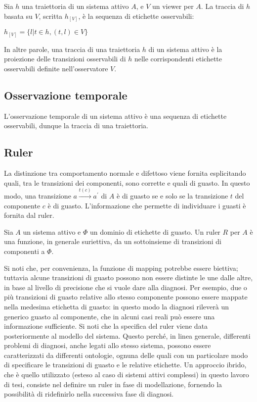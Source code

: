 \begin{defn}
Sia $h$ una traiettoria di un sistema attivo $A$, e $V$ un viewer per $A$. La traccia di $h$ basata su $V$, scritta $h_{[V]}$, è la sequenza di etichette osservabili:
\begin{center}
$h_{[V]} = \{l|t \in h, (t,l) \in V\}$
\end{center}
\end{defn}
In altre parole, una traccia di una traiettoria $h$ di un sistema attivo è la proiezione delle transizioni osservabili di $h$ nelle corrispondenti etichette osservabili definite nell'osservatore $V$.

\subsection{Osservazione temporale}
L'osservazione temporale di un sistema attivo è una sequenza di etichette osservabili, dunque la traccia di una traiettoria. 

\subsection{Ruler}
La distinzione tra comportamento normale e difettoso viene fornita esplicitando quali, tra le transizioni dei componenti, sono corrette e quali di guasto. In questo modo, una transizione $a \xrightarrow{t(c)} a^\prime$ di $A$ è di guasto se e solo se la transizione $t$ del componente $c$ è di guasto.
L'informazione che permette di individuare i guasti è fornita dal ruler.
\begin{defn}
Sia $A$ un sistema attivo e $\Phi$ un dominio di etichette di guasto. Un ruler $R$ per $A$ è una funzione, in generale suriettiva, da un sottoinsieme di transizioni di componenti a $\Phi$.
\end{defn}
Si noti che, per convenienza, la funzione di mapping potrebbe essere biettiva; tuttavia alcune transizioni di guasto possono non essere distinte le une dalle altre, in base al livello di precisione che si vuole dare alla diagnosi. Per esempio, due o più transizioni di guasto relative allo stesso componente possono essere mappate nella medesima etichetta di guasto: in questo modo la diagnosi rileverà un generico guasto al componente, che in alcuni casi reali può essere una informazione sufficiente.
Si noti che la specifica del ruler viene data posteriormente al modello del sistema. Questo perché, in linea generale, differenti problemi di diagnosi, anche legati allo stesso sistema, possono essere caratterizzati da differenti ontologie, ognuna delle quali con un particolare modo di specificare le transizioni di guasto e le relative etichette. Un approccio ibrido, che è quello utilizzato (esteso al caso di sistemi attivi complessi) in questo lavoro di tesi, consiste nel definire un ruler in fase di modellazione, fornendo la possibilità di ridefinirlo nella successiva fase di diagnosi.

